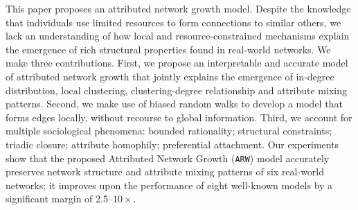 
This paper proposes an attributed network growth model. Despite the knowledge
that individuals use limited resources to form connections to similar others, we
lack an understanding of how local and resource-constrained mechanisms explain
the emergence of rich structural properties found in real-world networks. We
make three contributions. First, we propose an interpretable and accurate model
of attributed network growth that jointly explains the emergence of in-degree
distribution, local clustering, clustering-degree relationship and attribute
mixing patterns. Second, we make use of biased random walks to develop a model
that forms edges locally, without recourse to global information. Third, we
account for multiple sociological phenomena: bounded rationality; structural
constraints; triadic closure; attribute homophily; preferential attachment.
Our experiments show that the proposed Attributed Network Growth (\texttt{ARW}) model
accurately preserves network structure and attribute mixing patterns of
six real-world networks; it improves upon the performance of eight
well-known models by a significant margin of
2.5--$10\times$.
